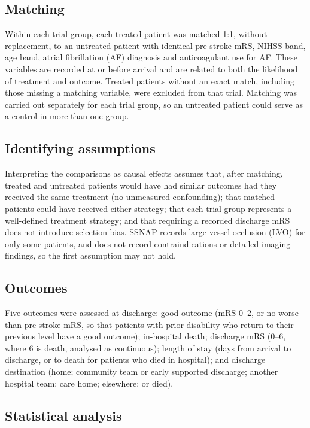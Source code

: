 \subsection{Matching}

Within each trial group, each treated patient was matched 1:1, without replacement, to an untreated patient with identical pre-stroke mRS, NIHSS band, age band, atrial fibrillation (AF) diagnosis and anticoagulant use for AF\cite{stuart_matching_2010}. These variables are recorded at or before arrival and are related to both the likelihood of treatment and outcome. Treated patients without an exact match, including those missing a matching variable, were excluded from that trial. Matching was carried out separately for each trial group, so an untreated patient could serve as a control in more than one group.

\subsection{Identifying assumptions}

Interpreting the comparisons as causal effects assumes that, after matching, treated and untreated patients would have had similar outcomes had they received the same treatment (no unmeasured confounding); that matched patients could have received either strategy; that each trial group represents a well-defined treatment strategy; and that requiring a recorded discharge mRS does not introduce selection bias. SSNAP records large-vessel occlusion (LVO) for only some patients, and does not record contraindications or detailed imaging findings, so the first assumption may not hold.

\subsection{Outcomes}

Five outcomes were assessed at discharge: good outcome (mRS 0--2, or no worse than pre-stroke mRS, so that patients with prior disability who return to their previous level have a good outcome); in-hospital death; discharge mRS (0--6, where 6 is death, analysed as continuous); length of stay (days from arrival to discharge, or to death for patients who died in hospital); and discharge destination (home; community team or early supported discharge; another hospital team; care home; elsewhere; or died).

\subsection{Statistical analysis}

